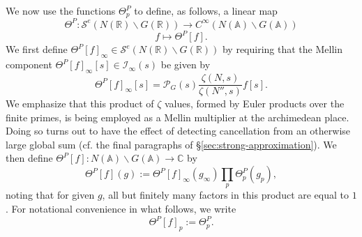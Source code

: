 \documentclass[reqno]{amsart}
\theoremstyle{plain} \newtheorem{theorem} {Theorem}
\theoremstyle{definition} \newtheorem{definition} [theorem] {Definition}
\theoremstyle{itplain} %
\numberwithin{equation}{section}
\numberwithin{theorem}{section}
\begin{document}
We now use the functions $\Theta^P_p$ to define, as follows, a linear map
\begin{equation*}
  \Theta^P : \mathcal{S}^e(N(\mathbb{R}) \backslash G(\mathbb{R})) \rightarrow C^\infty(N(\mathbb{A}) \backslash G(\mathbb{A}))
\end{equation*}
\begin{equation*}
  f \mapsto \Theta^P[f].
\end{equation*}
We first define $\Theta^P[f]_\infty \in \mathcal{S}^e(N(\mathbb{R}) \backslash G(\mathbb{R}))$ by requiring that the Mellin component $\Theta^P[f]_\infty [s] \in \mathcal{I}_\infty(s)$ be given by
\begin{equation*}
  \Theta^P[f]_\infty [s] = \mathcal{P}_G(s) \frac{\zeta(N,s)}{\zeta(N'', s)} f[s].
\end{equation*}
We emphasize that this product of $\zeta$ values, formed by Euler products over the finite primes, is being employed as a Mellin multiplier at the archimedean place.  Doing so turns out to have the effect of detecting cancellation from an otherwise large global sum (cf. the final paragraphs of \S\ref{sec:strong-approximation}).  We then define $\Theta^P[f] : N(\mathbb{A}) \backslash G(\mathbb{A}) \rightarrow \mathbb{C}$ by 
\begin{equation*}
\Theta^P[f](g) := \Theta^P[f]_{\infty}(g_\infty) \prod_p \Theta^P_p (g _{p}),
\end{equation*}
noting that for given $g$, all but finitely many factors in this product are equal to $1$.  For notational convenience in what follows, we write
\begin{equation*}
  \Theta^P[f]_p := \Theta_p^P.
\end{equation*}
\end{document}
